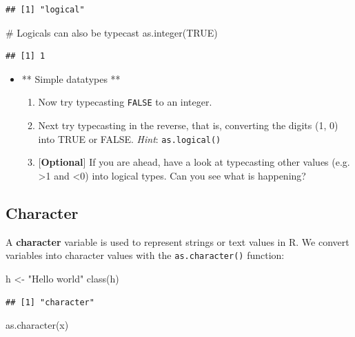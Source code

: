 \documentclass[a4paper]{book}
\newenvironment{Shaded}{}{}
\newcommand{\KeywordTok}[1]{\textcolor[rgb]{0.00,0.00,1.00}{{#1}}}
\newcommand{\StringTok}[1]{\textcolor[rgb]{0.00,0.50,0.50}{{#1}}}
\newcommand{\CommentTok}[1]{\textcolor[rgb]{0.00,0.50,0.00}{{#1}}}
\newcommand{\OtherTok}[1]{\textcolor[rgb]{1.00,0.25,0.00}{{#1}}}
\newcommand{\NormalTok}[1]{{#1}}
\newlength{\leftbarwidth}
\newlength{\leftbarsep}
\newcommand*{\leftbarcolorcmd}{\color{darkgray}}%
\renewenvironment{leftbar}{%
    \def\FrameCommand{{\leftbarcolorcmd{\vrule width \leftbarwidth\relax\hspace {\leftbarsep}}}}%
    \MakeFramed {\advance \hsize -\width \FrameRestore }%
}{%
    \endMakeFramed
}
\renewenvironment{Shaded}
{\vspace{0em}\begin{leftbar}\begin{snugshade}}
{\end{snugshade}\end{leftbar}\vspace{0pt}}
\newenvironment{rmdblock}[1]
  {\vspace{1.5em}\begin{shaded*}
  \begin{itemize}
  \renewcommand{\labelitemi}{
    \raisebox{-.7\height}[0pt][0pt]{
      {\setkeys{Gin}{width=3em,keepaspectratio}\texttt{[image: images/\#1]}}
    }
  }
  \item
  }
  {
  \end{itemize}
  \end{shaded*}
  }
\newenvironment{rmdexercise}
  {\begin{rmdblock}{exercise}}
  {\end{rmdblock}}
\begin{document}
\begin{verbatim}
## [1] "logical"
\end{verbatim}

\begin{Shaded}
\begin{Highlighting}[]
\CommentTok{# Logicals can also be typecast}
\KeywordTok{as.integer}\NormalTok{(}\OtherTok{TRUE}\NormalTok{)}
\end{Highlighting}
\end{Shaded}

\begin{verbatim}
## [1] 1
\end{verbatim}

\begin{rmdexercise}
** Simple datatypes **

\begin{enumerate}
\def\labelenumi{\arabic{enumi}.}
\item
  Now try typecasting \texttt{FALSE} to an integer.
\item
  Next try typecasting in the reverse, that is, converting the digits
  (1, 0) into TRUE or FALSE. \emph{Hint}: \texttt{as.logical()}
\item
  {[}\textbf{Optional}{]} If you are ahead, have a look at typecasting
  other values (e.g. \textgreater{}1 and \textless{}0) into logical
  types. Can you see what is happening?
\end{enumerate}
\end{rmdexercise}

\subsection{Character}\label{character}

A \textbf{character} variable is used to represent strings or text
values in R. We convert variables into character values with the
\texttt{as.character()} function:

\begin{Shaded}
\begin{Highlighting}[]
\NormalTok{h <-}\StringTok{ "Hello world"}
\KeywordTok{class}\NormalTok{(h)}
\end{Highlighting}
\end{Shaded}

\begin{verbatim}
## [1] "character"
\end{verbatim}

\begin{Shaded}
\begin{Highlighting}[]
\KeywordTok{as.character}\NormalTok{(x)}
\end{Highlighting}
\end{Shaded}
\end{document}
